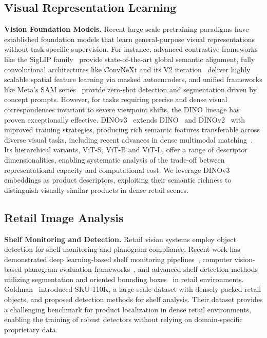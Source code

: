 \documentclass[10pt,twocolumn,letterpaper]{article}
\begin{document}
\subsection{Visual Representation Learning}
\label{subsec:representation}

\noindent\textbf{Vision Foundation Models.}
Recent large-scale pretraining paradigms have established foundation models that learn general-purpose visual representations without task-specific supervision. For instance, advanced contrastive frameworks like the SigLIP family~\cite{Zhai_2023_ICCV, tschannen2025siglip2multilingualvisionlanguage} provide state-of-the-art global semantic alignment, fully convolutional architectures like ConvNeXt and its V2 iteration~\cite{Liu_2022_CVPR, Woo_2023_CVPR} deliver highly scalable spatial feature learning via masked autoencoders, and unified frameworks like Meta's SAM series~\cite{Kirillov_2023_ICCV, ravi2024sam2segmentimages, carion2025sam3segmentconcepts} provide zero-shot detection and segmentation driven by concept prompts. However, for tasks requiring precise and dense visual correspondences invariant to severe viewpoint shifts, the DINO lineage has proven exceptionally effective. DINOv3~\cite{dinov3} extends DINO~\cite{zhang2022dinodetrimproveddenoising} and DINOv2~\cite{oquab2024dinov2learningrobustvisual} with improved training strategies, producing rich semantic features transferable across diverse visual tasks, including recent advances in dense multimodal matching~\cite{yang2025distillmatchleveragingknowledgedistillation}. Its hierarchical variants, ViT-S, ViT-B and ViT-L, offer a range of descriptor dimensionalities, enabling systematic analysis of the trade-off between representational capacity and computational cost. We leverage DINOv3 embeddings as product descriptors, exploiting their semantic richness to distinguish visually similar products in dense retail scenes.

\subsection{Retail Image Analysis}
\label{subsec:retail}

\noindent\textbf{Shelf Monitoring and Detection.}
Retail vision systems employ object detection for shelf monitoring and planogram compliance. Recent work has demonstrated deep learning-based shelf monitoring pipelines~\cite{Pietrini2024ShelfManagement}, computer vision-based planogram evaluation frameworks~\cite{planogram_monitoring}, and advanced shelf detection methods utilizing segmentation and oriented bounding boxes~\cite{11112148} in retail environments. Goldman~\etal \cite{sku110k} introduced SKU-110K, a large-scale dataset with densely packed retail objects, and proposed detection methods for shelf analysis. Their dataset provides a challenging benchmark for product localization in dense retail environments, enabling the training of robust detectors without relying on domain-specific proprietary data.
\end{document}

